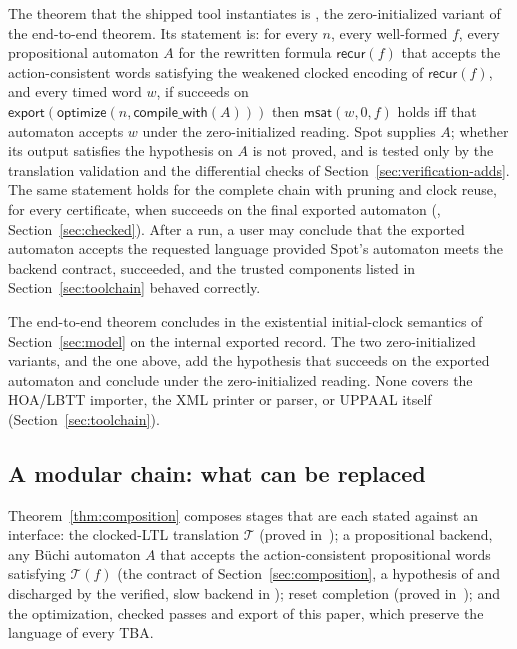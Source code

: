 \documentclass[preprint,12pt]{elsarticle}
\let\pathfragile\path
\DeclareRobustCommand\path{\pathfragile}
\providecommand{\T}{\mathcal{T}}
\providecommand{\optimize}{\mathsf{optimize}}
\providecommand{\export}{\mathsf{export}}
\begin{document}
The theorem that the shipped tool instantiates is , the zero-initialized variant of the end-to-end theorem. Its statement is: for every $n$, every well-formed $f$, every propositional automaton $A$ for the rewritten formula $\mathsf{recur}(f)$ that accepts the action-consistent words satisfying the weakened clocked encoding of $\mathsf{recur}(f)$, and every timed word $w$, if  succeeds on $\export(\optimize(n,\mathsf{compile\_with}(A)))$ then $\mathsf{msat}(w,0,f)$ holds iff that automaton accepts $w$ under the zero-initialized reading. Spot supplies $A$; whether its output satisfies the hypothesis on $A$ is not proved, and is tested only by the translation validation and the differential checks of Section~\ref{sec:verification-adds}. The same statement holds for the complete chain with pruning and clock reuse, for every certificate, when  succeeds on the final exported automaton (, Section~\ref{sec:checked}). After a run, a user may conclude that the exported automaton accepts the requested language provided Spot's automaton meets the backend contract,  succeeded, and the trusted components listed in Section~\ref{sec:toolchain} behaved correctly.

The end-to-end theorem  concludes in the existential initial-clock semantics of Section~\ref{sec:model} on the internal exported record. The two zero-initialized variants,  and the  one above, add the hypothesis that  succeeds on the exported automaton and conclude under the zero-initialized reading. None covers the HOA/LBTT importer, the XML printer or parser, or UPPAAL itself (Section~\ref{sec:toolchain}).

\subsection{A modular chain: what can be replaced}
\label{sec:modular}
Theorem~\ref{thm:composition} composes stages that are each stated against an interface: the clocked-LTL translation $\T$ (proved in~\cite{faresmtl}); a propositional backend, any B\"uchi automaton $A$ that accepts the action-consistent propositional words satisfying $\T(f)$ (the contract of Section~\ref{sec:composition}, a hypothesis of  and discharged by the verified, slow backend in ); reset completion  (proved in~\cite{faresmtl}); and the optimization, checked passes and export of this paper, which preserve the language of every TBA.
\end{document}
